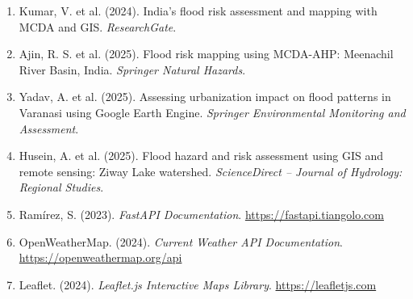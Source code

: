 \documentclass[12pt,a4paper]{report}
\begin{document}
\begin{enumerate}[noitemsep]
  \item Kumar, V. et al. (2024). India's flood risk assessment and mapping with MCDA and GIS. \textit{ResearchGate}.

  \item Ajin, R. S. et al. (2025). Flood risk mapping using MCDA-AHP: Meenachil River Basin, India. \textit{Springer Natural Hazards}.

  \item Yadav, A. et al. (2025). Assessing urbanization impact on flood patterns in Varanasi using Google Earth Engine. \textit{Springer Environmental Monitoring and Assessment}.

  \item Husein, A. et al. (2025). Flood hazard and risk assessment using GIS and remote sensing: Ziway Lake watershed. \textit{ScienceDirect -- Journal of Hydrology: Regional Studies}.

  \item Ramírez, S. (2023). \textit{FastAPI Documentation}. \url{https://fastapi.tiangolo.com}

  \item OpenWeatherMap. (2024). \textit{Current Weather API Documentation}. \url{https://openweathermap.org/api}

  \item Leaflet. (2024). \textit{Leaflet.js Interactive Maps Library}. \url{https://leafletjs.com}
\end{enumerate}

\end{document}
